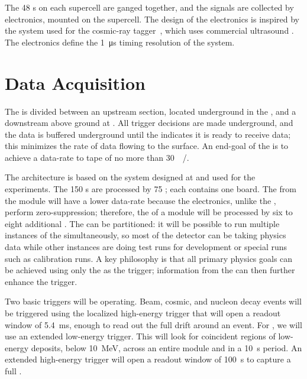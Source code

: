 The 48 s on each  supercell are ganged together, and the signals are collected by  electronics, mounted on the supercell. The design of the   electronics is inspired by the system used for the  cosmic-ray tagger~\cite{bib:mu2e_tdr}, which uses commercial ultrasound . The  electronics define the \SI{1}{\micro\second} timing resolution of the  system.



\section{Data Acquisition}
\label{sec:exec-sp-daq}


The  is divided between an upstream section, located underground in the , and a downstream  above ground at . All trigger decisions are made underground, and the data is buffered underground until the  indicates it is ready to receive data; this minimizes the rate of data flowing to the surface. An end-goal of the  is to achieve a data-rate to tape of no more than \SI{30}{\peta\byte/\year}.

The  architecture is based on the  system designed at  and used for the  
experiments. The 150 s are processed by 75 ; each  contains one  board. The  from the module will have a lower data-rate because the  electronics, unlike the , perform zero-suppression; therefore, the  of a module will be processed by six to eight additional . The  can be partitioned: it will be possible to run multiple instances of the  simultaneously, so most of the detector can be taking physics data while other  instances are doing test runs for development or special runs such as calibration runs. A key philosophy is that all primary  physics goals can be achieved using only the  as the trigger; information from the  can then further enhance the trigger.

Two basic triggers will be operating. Beam, cosmic, and nucleon decay events will be triggered using the localized high-energy trigger 
that will open a readout window of \SI{5.4}{\ms}, enough to read out the full  drift around an event. For , we will use an extended low-energy trigger. This will look for coincident regions of low-energy deposits, below \SI{10}{\mega\electronvolt}, across an entire module and in a \SI{10}{\second} period. An extended high-energy trigger will open a readout window of \SI{100}{\second} to capture a full . 


